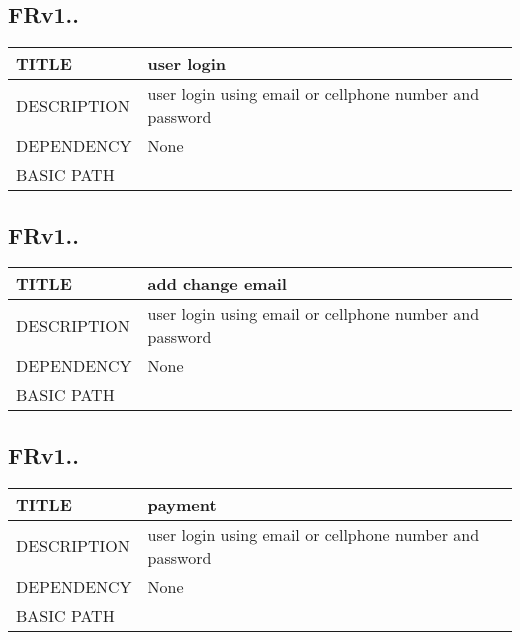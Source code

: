 \documentclass{scrreprt}
\begin{document}
\subsection{FRv1..}
\begin{table}[]
    \centering
    \begin{tabular}{|l|l|}
        \hline
         TITLE& user login\\ \hline
         DESCRIPTION& user login using email or cellphone number and password   \\ \hline
         DEPENDENCY& None \\ \hline
         BASIC PATH&  \\ \hline
    \end{tabular}
\end{table}

\subsection{FRv1..}
\begin{table}[]
    \centering
    \begin{tabular}{|l|l|}
        \hline
         TITLE& add change email\\ \hline
         DESCRIPTION& user login using email or cellphone number and password   \\ \hline
         DEPENDENCY& None \\ \hline
         BASIC PATH&  \\ \hline
    \end{tabular}
\end{table}


\subsection{FRv1..}
\begin{table}[]
    \centering
    \begin{tabular}{|l|l|}
        \hline
         TITLE& payment\\ \hline
         DESCRIPTION& user login using email or cellphone number and password   \\ \hline
         DEPENDENCY& None \\ \hline
         BASIC PATH&  \\ \hline
    \end{tabular}
\end{table}
\end{document}

